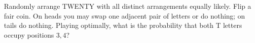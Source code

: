 Randomly arrange TWENTY with all distinct arrangements equally likely. Flip a fair coin. On heads you may swap one adjacent pair of letters or do nothing; on tails do nothing. Playing optimally, what is the probability that both T letters occupy positions $3,4$?
